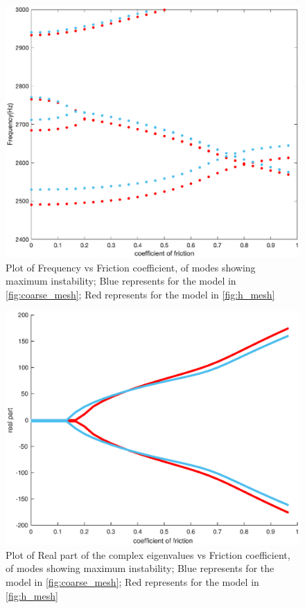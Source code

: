 \begin{figure}
    \centering
    \includegraphics[scale=0.43]{Chapter2/Pictures/hvsh1_freq1.eps}
    \caption{Plot of Frequency vs Friction coefficient, of modes showing maximum instability; Blue represents for the model in \ref{fig:coarse_mesh}; Red represents for the model in \ref{fig:h_mesh}}
    \label{fig:h_freq}
\end{figure}

\begin{figure}
    \centering
    \includegraphics[scale=0.43]{Chapter2/Pictures/hvsh1_real.eps}
    \caption{Plot of Real part of the complex eigenvalues vs Friction coefficient, of modes showing maximum instability; Blue represents for the model in \ref{fig:coarse_mesh}; Red represents for the model in \ref{fig:h_mesh}}
    \label{fig:h_real}
\end{figure}

